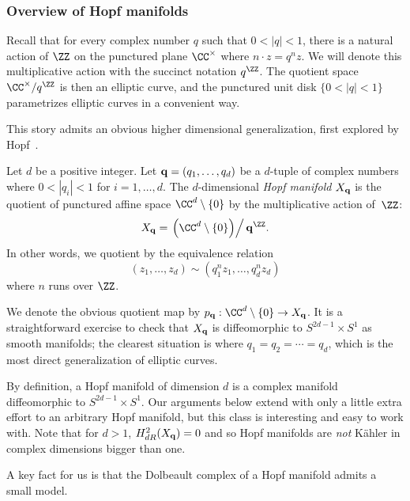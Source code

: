 
\subsubsection{Overview of Hopf manifolds}

Recall that for every complex number $q$ such that $0< |q| < 1$, 
there is a natural action of $\ZZ$ on the punctured plane $\CC^\times$ where $n \cdot z = q^n z$.
We will denote this multiplicative action with the succinct notation $q^\ZZ$.
The quotient space $\CC^\times/q^\ZZ$ is then an elliptic curve,
and the punctured unit disk $\{0< |q|<1\}$ parametrizes elliptic curves in a convenient way.

This story admits an obvious higher dimensional generalization, first explored by Hopf~\cite{Hopf}.

\begin{dfn}
Let $d$ be a positive integer.
Let ${\bf q} = (q_1,\ldots, q_d)$ be a $d$-tuple of complex numbers where $0 < |q_i| < 1$ for $i = 1, \ldots, d$. 
The $d$-dimensional {\em Hopf manifold} $X_{\bf q}$ is the quotient of punctured affine space $\CC^d \setminus \{0\}$ by the multiplicative action of~$\ZZ$:
\[
X_{\bf q} = \left. \left(\CC^d \setminus \{0\}\right) \right/ {\bf q}^\ZZ.  
\]
In other words, we quotient by the equivalence relation
\[
(z_1,\ldots,z_d) \sim (q_1^{n} z_1, \ldots,q_d^{n} z_d)
\]
where $n$ runs over $\ZZ$.
\end{dfn}


We denote the obvious quotient map by $p_{\bf q} : \CC^d \setminus \{0\} \to X_{\bf q}$. 
It is a straightforward exercise to check that $X_{\bf q}$ is diffeomorphic to $S^{2d-1} \times S^1$ as smooth manifolds;
the clearest situation is where $q_1 = q_2 = \cdots = q_d$,
which is the most direct generalization of elliptic curves.

\begin{rmk}
By definition, a Hopf manifold of dimension $d$ is a complex manifold diffeomorphic to $S^{2d-1} \times S^1$. 
Our arguments below extend with only a little extra effort to an arbitrary Hopf manifold, 
but this class is interesting and easy to work with.
Note that for $d>1$, $H^{2}_{dR} (X_{\bf q}) = 0$ and so Hopf manifolds are {\em not} K\"{a}hler in complex dimensions bigger than one. 
\end{rmk}

A key fact for us is that the Dolbeault complex of a Hopf manifold admits a small model.

